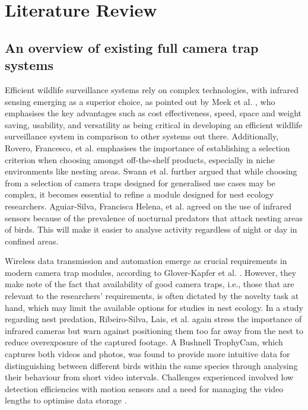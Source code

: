 \documentclass[class=report,11pt,crop=false]{standalone}
\begin{document}
\ifstandalone
\tableofcontents
\fi
\chapter{Literature Review \label{ch:literature}}

\section{An overview of existing full camera trap systems}


Efficient wildlife surveillance systems rely on complex technologies, with infrared sensing emerging as a superior choice, as pointed out by Meek et al. \cite{meek2012user}, who emphasises the key advantages such as cost effectiveness, speed, space and weight saving, usability, and versatility as being critical in developing an efficient wildlife surveillance system in comparison to other systems out there. Additionally, Rovero, Francesco, et al. \cite{rovero2013which} emphasises the importance of establishing a selection criterion when choosing amongst off-the-shelf products, especially in niche environments like nesting areas. Swann et al. \cite{swann2011evaluating} further argued that while choosing from a selection of camera traps designed for generalised use cases may be complex, it becomes essential to refine a module designed for nest ecology researchers. Aguiar-Silva, Francisca Helena, et al. \cite{aguiar-silva2017camera} agreed on the use of infrared sensors because of the prevalence of nocturnal predators that attack nesting areas of birds. This will make it easier to analyse activity regardless of night or day in confined areas.

Wireless data transmission and automation emerge as crucial requirements in modern camera trap modules, according to Glover-Kapfer et al. \cite{glover2019camera}. However, they make note of the fact that availability of good camera traps, i.e., those that are relevant to the researchers’ requirements, is often dictated by the novelty task at hand, which may limit the available options for studies in nest ecology. In a study regarding nest predation, Ribeiro-Silva, Lais, et al. \cite{ribeiro-silva2018testing} again stress the importance of infrared cameras but warn against positioning them too far away from the nest to reduce overexposure of the captured footage. A Bushnell TrophyCam, which captures both videos and photos, was found to provide more intuitive data for distinguishing between different birds within the same species through analysing their behaviour from short video intervals. Challenges experienced involved low detection efficiencies with motion sensors and a need for managing the video lengths to optimise data storage \cite{ribeiro-silva2018testing}. 
\end{document}
